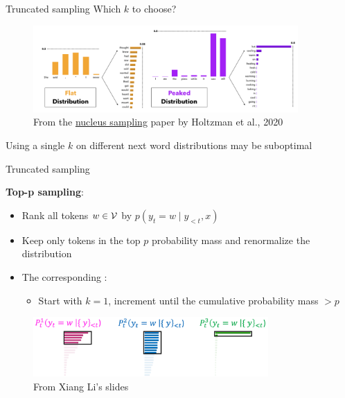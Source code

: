 \documentclass[usenames,dvipsnames,notes,11pt,aspectratio=169,hyperref={colorlinks=true, linkcolor=blue}]{beamer}
\begin{document}
\begin{frame}
    {Truncated sampling}
    Which $k$ to choose?
    \begin{figure}
        \includegraphics[width=0.9\textwidth]{figures/dynamic-k}
        \caption{From the \href{https://arxiv.org/pdf/1904.09751.pdf}{nucleus sampling} paper by Holtzman et al., 2020}
    \end{figure}
    Using a single $k$ on different next word distributions may be suboptimal
\end{frame}

\begin{frame}
    {Truncated sampling}
    
    \textbf{Top-p sampling}:\\
    \begin{itemize}
        \item Rank all tokens $w\in\mathcal{V}$ by $p(y_t=w\mid y_{<t},x)$
        \item Keep only tokens in the top $p$ probability mass
            and renormalize the distribution
        \item The corresponding :
            \begin{itemize}
            \item Start with $k=1$, increment until the cumulative probability mass $>p$
            \end{itemize}
    \end{itemize}
    \begin{figure}
        \includegraphics[width=0.8\textwidth]{figures/top-p}
        \caption{From Xiang Li's slides}
    \end{figure}
\end{frame}
\end{document}
